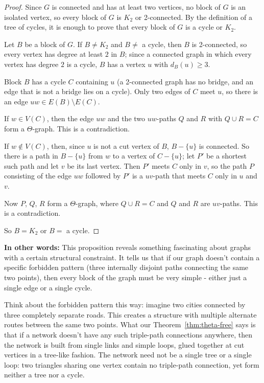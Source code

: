 \documentclass{article}
\theoremstyle{definition}
\begin{document}
\begin{proof}
Since $G$ is connected and has at least two vertices, no block of $G$ is an isolated vertex, so every block of $G$ is $K_2$ or 2-connected. By the definition of a tree of cycles, it is enough to prove that every block of $G$ is a cycle or $K_2$.

Let $B$ be a block of $G$. If $B \neq K_2$ and $B \neq$ a cycle, then $B$ is 2-connected, so every vertex has degree at least $2$ in $B$; since a connected graph in which every vertex has degree $2$ is a cycle, $B$ has a vertex $u$ with $d_B(u) \geq 3$.

Block $B$ has a cycle $C$ containing $u$ (a 2-connected graph has no bridge, and an edge that is not a bridge lies on a cycle). Only two edges of $C$ meet $u$, so there is an edge $uw \in E(B) \setminus E(C)$.

If $w \in V(C)$, then the edge $uw$ and the two $uw$-paths $Q$ and $R$ with $Q \cup R = C$ form a $\Theta$-graph. This is a contradiction.

If $w \notin V(C)$, then, since $u$ is not a cut vertex of $B$, $B - \{u\}$ is connected. So there is a path in $B - \{u\}$ from $w$ to a vertex of $C - \{u\}$; let $P'$ be a shortest such path and let $v$ be its last vertex. Then $P'$ meets $C$ only in $v$, so the path $P$ consisting of the edge $uw$ followed by $P'$ is a $uv$-path that meets $C$ only in $u$ and $v$.

Now $P$, $Q$, $R$ form a $\Theta$-graph, where $Q \cup R = C$ and $Q$ and $R$ are $uv$-paths. This is a contradiction.

So $B = K_2$ or $B =$ a cycle.
\end{proof}

\medskip
\noindent\textbf{In other words:} This proposition reveals something fascinating about graphs with a certain structural constraint. It tells us that if our graph doesn't contain a specific forbidden pattern (three internally disjoint paths connecting the same two points), then every block of the graph must be very simple - either just a single edge or a single cycle.

Think about the forbidden pattern this way: imagine two cities connected by three completely separate roads. This creates a structure with multiple alternate routes between the same two points. What our Theorem~\ref{thm:theta-free} says is that if a network doesn't have any such triple-path connections anywhere, then the network is built from single links and simple loops, glued together at cut vertices in a tree-like fashion. The network need not be a single tree or a single loop: two triangles sharing one vertex contain no triple-path connection, yet form neither a tree nor a cycle.
\end{document}
